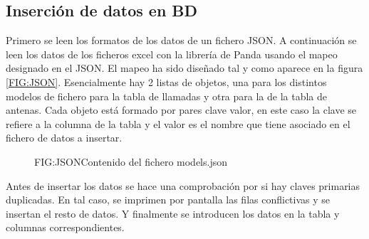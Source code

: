     \subsection{Inserción de datos en BD}
      Primero se leen los formatos de los datos de un fichero JSON.
      A continuación se leen los datos de los ficheros excel con la librería de Panda usando el mapeo designado en el JSON.
      El mapeo ha sido diseñado tal y como aparece en la figura \ref{FIG:JSON}. Esencialmente hay 2 listas de objetos, una para los distintos modelos de fichero para la tabla de llamadas y otra para la de la tabla de antenas.
      Cada objeto está formado por pares clave valor, en este caso la clave se refiere a la columna de la tabla y el valor es el nombre que tiene asociado en el fichero de datos a insertar.
      \begin{figure}[Contenido del fichero models.json]{FIG:JSON}{Contenido del fichero models.json}
      \end{figure}
      Antes de insertar los datos se hace una comprobación por si hay claves primarias duplicadas. En tal caso, se imprimen por pantalla las filas conflictivas y se insertan el resto de datos. 
      Y finalmente se introducen los datos en la tabla y columnas correspondientes.
